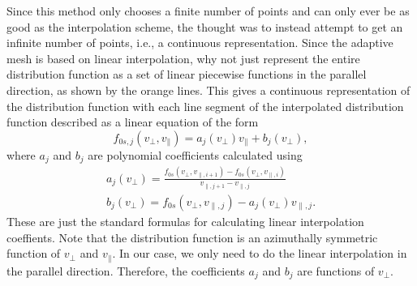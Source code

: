 Since this method only chooses a finite number of points and can only ever be as good as the interpolation scheme, 
the thought was to instead attempt to get an infinite number of points, i.e., a continuous representation.
Since the adaptive mesh is based on linear interpolation, why not just represent the entire distribution function as a set of 
linear piecewise functions in the parallel direction, as shown by the orange lines.
This gives a continuous representation of the distribution function with each line segment of the interpolated
distribution function described as a linear equation of the form
\begin{equation}
	f_{0s,j} (v_\perp, v_\parallel) = a_j(v_\perp) v_\parallel + b_j (v_\perp),
	\label{eq:fLinear}
\end{equation}
where $a_j$ and $b_j$ are polynomial coefficients calculated using
\begin{align}
	a_j(v_\perp) = \frac{f_{0s}(v_\perp, v_{\parallel,i+1}) - f_{0s}(v_\perp, v_{\parallel,i})}{v_{\parallel,j+1}-v_{\parallel,j}}
	\label{eq:aCoeff} \\
	b_j(v_\perp) = f_{0s}(v_\perp, v_{\parallel,j}) - a_j(v_\perp) v_{\parallel,j}.
	\label{eq:bCoeff}
\end{align}
These are just the standard formulas for calculating linear interpolation coeffients. 
Note that the distribution function is an azimuthally symmetric function of $v_\perp$ and $v_\parallel$.
In our case, we only need to do the linear interpolation in the parallel direction.
Therefore, the coefficients $a_j$ and $b_j$ are functions of $v_\perp$.

